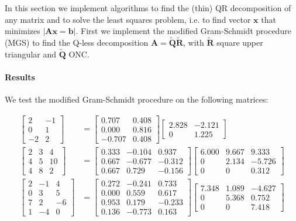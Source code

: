 \documentclass[a4paper,11]{article}
\begin{document}
In this section we implement algorithms to find the (thin) QR decomposition of
any matrix and to solve the least squares problem, i.e. 
to find vector $\mathbf x$ that minimizes $|\mathbf A\mathbf x = \mathbf b|$. 
First we implement the modified Gram-Schmidt procedure (MGS) to find the 
Q-less decomposition $\mathbf A = \mathbf{\tilde{Q}\tilde{R}}$, with 
$\mathbf{\tilde{R}}$
square upper triangular and $\mathbf{\tilde{Q}}$ ONC.

\paragraph{Results}

We test the modified Gram-Schmidt procedure on the following matrices:

\[{}
\begin{aligned}
	\begin{bmatrix}
		2 & -1 \\
		0 & 1 \\
		-2 & 2
	\end{bmatrix}&=
	\begin{bmatrix}
		0.707 & 0.408 \\
		0.000 & 0.816 \\
		-0.707 & 0.408
	\end{bmatrix}
	\begin{bmatrix}
		2.828 & -2.121 \\
		0 & 1.225
	\end{bmatrix}\\
%
	\begin{bmatrix}
		2 & 3 & 4 \\
		4 & 5 & 10 \\
		4 & 8 & 2
	\end{bmatrix}
	&=
	\begin{bmatrix}
		 0.333 & -0.104 &  0.937 \\
		 0.667 & -0.677 & -0.312 \\
		 0.667 &  0.729 & -0.156
	\end{bmatrix}
	\begin{bmatrix}
		6.000 & 9.667 & 9.333 \\
		0      & 2.134 & -5.726 \\
		0      & 0      &  0.312
	\end{bmatrix}\\
%
	\begin{bmatrix}
		2 & -1 & 4 \\
		0 & 3 & 5 \\
		7 & 2 & -6 \\
		1 & -4 & 0
	\end{bmatrix}
	&=
	\begin{bmatrix}
		 0.272 & -0.241 &  0.733 \\
		 0.000 &  0.559 &  0.617 \\
		 0.953 &  0.179 & -0.233 \\
		 0.136 & -0.773 &  0.163
	\end{bmatrix}
	\begin{bmatrix}
		7.348 & 1.089 & -4.627 \\
		0     & 5.368 &  0.752 \\
		0     & 0     &  7.418
	\end{bmatrix}
\end{aligned}
\]
\end{document}

